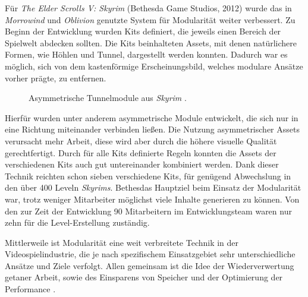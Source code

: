 \par
Für \textit{The Elder Scrolls V: Skyrim} (Bethesda Game Studios, 2012) wurde 
das in \textit{Morrowind} und \textit{Oblivion} genutzte System für Modularität weiter verbessert. Zu Beginn der Entwicklung wurden Kits definiert, die jeweils einen Bereich der Spielwelt abdecken sollten. Die Kits beinhalteten Assets, mit denen natürlichere Formen, wie Höhlen und Tunnel, dargestellt werden konnten. Dadurch war es möglich, sich von dem kastenförmige Erscheinungsbild, welches modulare Ansätze vorher prägte, zu entfernen.
\begin{figure}[H]
\centering
  \caption{Asymmetrische Tunnelmodule aus \textit{Skyrim} \parencite{Burgess}.}
\label{ForHonorImage}
\end{figure}
\vspace{-10.5pt}
Hierfür wurden unter anderem asymmetrische Module entwickelt, die sich nur in eine Richtung miteinander verbinden ließen. Die Nutzung asymmetrischer Assets verursacht mehr Arbeit, diese wird aber durch die höhere visuelle Qualität gerechtfertigt. Durch für alle Kits definierte Regeln konnten die Assets der verschiedenen Kits auch gut untereinander kombiniert werden. Dank dieser Technik reichten schon sieben verschiedene Kits, für genügend Abwechslung in den über 400 Leveln \textit{Skyrims}. Bethesdas Hauptziel beim Einsatz der Modularität war, trotz weniger Mitarbeiter möglichst viele Inhalte generieren zu können. Von den zur Zeit der Entwicklung 90 Mitarbeitern im Entwicklungsteam waren nur zehn für die Level-Erstellung zuständig. \parencite{Burgess}
\par
Mittlerweile ist Modularität eine weit verbreitete Technik in der Videospielindustrie, die je nach spezifischem Einsatzgebiet sehr unterschiedliche Ansätze und Ziele verfolgt. Allen gemeinsam ist die Idee der Wiederverwertung getaner Arbeit, sowie des Einsparens von Speicher und der Optimierung der Performance \parencite{Meler}.
